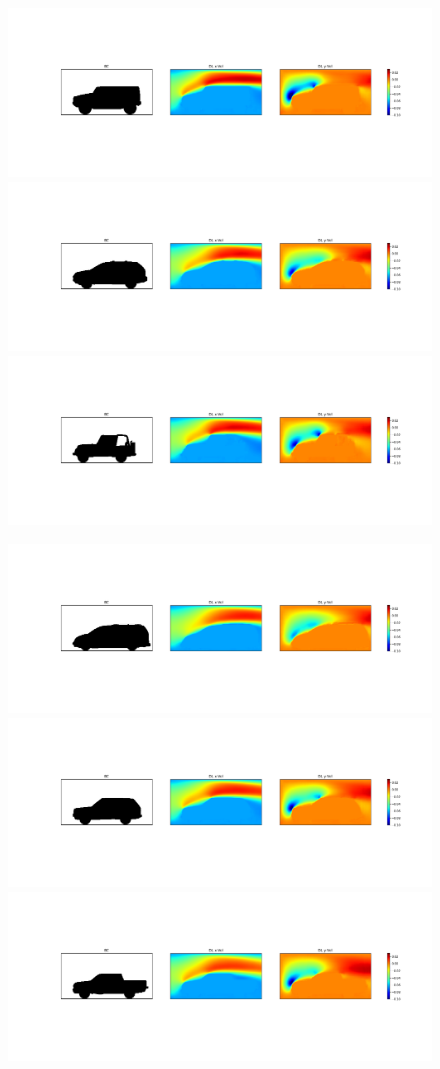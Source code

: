 \documentclass{beamer}
\begin{document}
\begin{frame}
\begin{figure}[h]
\includegraphics[height=0.16\linewidth, trim = 5.80cm 7.35cm 33.4cm 7.2cm, clip]{../../../plots/plots/cars/comparison/montage_car_DL_05.png}%
\includegraphics[height=0.16\linewidth, trim = 5.80cm 7.35cm 33.4cm 7.2cm, clip]{../../../plots/plots/cars/comparison/montage_car_DL_06.png}%
\includegraphics[height=0.16\linewidth, trim = 5.80cm 7.35cm 33.4cm 7.2cm, clip]{../../../plots/plots/cars/comparison/montage_car_DL_07.png}%

\includegraphics[height=0.16\linewidth, trim = 5.80cm 7.35cm 33.4cm 7.2cm, clip]{../../../plots/plots/cars/comparison/montage_car_DL_08.png}%
\includegraphics[height=0.16\linewidth, trim = 5.80cm 7.35cm 33.4cm 7.2cm, clip]{../../../plots/plots/cars/comparison/montage_car_DL_09.png}%
\includegraphics[height=0.16\linewidth, trim = 5.80cm 7.35cm 33.4cm 7.2cm, clip]{../../../plots/plots/cars/comparison/montage_car_DL_10.png}%
\end{figure}
\end{frame}
\end{document}
